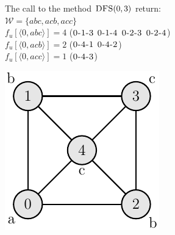 	\begin{minipage}{0.6\textwidth}\raggedright
		\begin{esempio}
		\end{esempio}
		The call to the method $\textsc{DFS}(0, 3)$ return:\\
		
		$\mathcal{W} = \{ abc, acb, acc \}$\\
		$f_{u}[\langle 0, abc \rangle] = 4$ ($\textsc{0-1-3}$ $\textsc{0-1-4}$ $\textsc{0-2-3}$ $\textsc{0-2-4}$)\\
		$f_{u}[\langle 0, acb \rangle] = 2$ ($\textsc{0-4-1}$ $\textsc{0-4-2}$)\\
		$f_{u}[\langle 0, acc \rangle] = 1$ ($\textsc{0-4-3}$)\\
	\end{minipage}
	\begin{minipage}{0.35\textwidth}
		\includegraphics[width=\linewidth]{figure/figure-3-2}
	\end{minipage}
			
\clearpage

